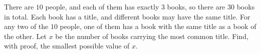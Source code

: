There are $10$ people, and each of them has exactly $3$ books, so there are $30$ books in total. Each book has a title, and different books may have the same title. For any two of the $10$ people, one of them has a book with the same title as a book of the other. Let $x$ be the number of books carrying the most common title. Find, with proof, the smallest possible value of $x$.
